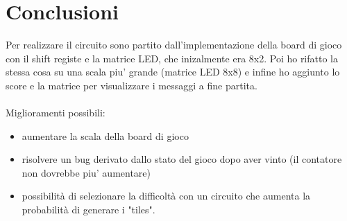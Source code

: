 \documentclass[11pt]{article}
\begin{document}
\section{Conclusioni}

Per realizzare il circuito sono partito dall'implementazione della board di gioco con il shift registe e la matrice LED, che inizalmente era 8x2. Poi ho
rifatto la stessa cosa su una scala piu' grande (matrice LED 8x8) e infine ho aggiunto lo score e la matrice per visualizzare i messaggi a fine partita.
\\ \\
Miglioramenti possibili:
\begin{itemize}
\item aumentare la scala della board di gioco
\item risolvere un bug derivato dallo stato del gioco dopo aver vinto (il contatore non dovrebbe piu' aumentare)
\item possibilità di selezionare la difficoltà con un circuito che aumenta la probabilità di generare i "tiles".
\end{itemize}
\end{document}

